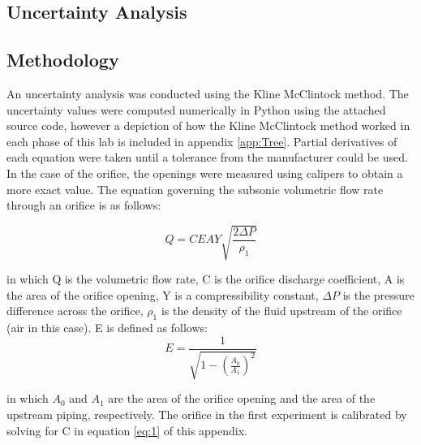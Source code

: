 \documentclass[paper=letter, fontsize=10pt]{scrartcl} %
\begin{document}
\begin{appendices}
\clearpage

\section{Uncertainty Analysis}\label{app:Unc}
\subsection{Methodology}\label{app:Method}
An uncertainty analysis was conducted using the Kline McClintock method.  The uncertainty values were computed numerically in Python using the attached source code, however a depiction of how the Kline McClintock method worked in each phase of this lab is included in appendix \ref{app:Tree}.  Partial derivatives of each equation were taken until a tolerance from the manufacturer could be used.  In the case of the orifice, the openings were measured using calipers to obtain a more exact value.
\newline
\newline
The equation governing the subsonic volumetric flow rate through an orifice is as follows:

\begin{equation}\label{eq:1}
Q = C E A Y \sqrt{\frac{2 \Delta P}{\rho_1}}
\end{equation}

in which Q is the volumetric flow rate, C is the orifice discharge coefficient, A is the area of the orifice opening, Y is a compressibility constant, \(\Delta P\) is the pressure difference across the orifice, \(\rho_1\) is the density of the fluid upstream of the orifice (air in this case).  E is defined as follows:
\begin{equation}\label{eq:2}
E =  \frac{1}{\sqrt{1 - (\frac{A_0}{A_1})^2}}
\end{equation}

in which \(A_0\) and \(A_1\) are the area of the orifice opening and the area of the upstream piping, respectively.  The orifice in the first experiment is calibrated by solving for C in equation \ref{eq:1} of this appendix.  
\newline

%
%


\end{appendices}
\end{document}
